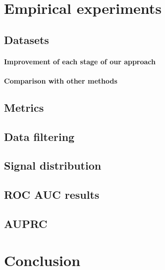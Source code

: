 \documentclass[wcp]{jmlr}
\begin{document}
\section{Empirical experiments}
\subsection{Datasets}

\paragraph{Improvement of each stage of our approach\\}
\paragraph{Comparison with other methods\\}

\subsection{Metrics}
\subsection{Data filtering}
\subsection{Signal distribution}
\subsection{ROC AUC results}
\subsection{AUPRC}

\section{Conclusion}




\end{document}
